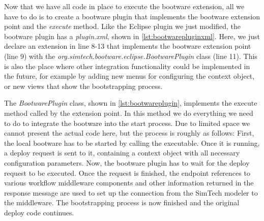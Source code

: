 \vspace*{\baselineskip}


Now that we have all code in place to execute the bootware extension, all we have to do is to create a bootware plugin that implements the bootware extension point and the \textit{execute} method.
Like the Eclipse plugin we just modified, the bootware plugin has a \textit{plugin.xml}, shown in \autoref{lst:bootwarepluginxml}.
Here, we just declare an extension in line 8-13 that implements the bootware extension point (line 9) with the \textit{org.simtech.bootware.eclipse.BootwarePlugin} class (line 11).
This is also the place where other integration functionality could be implemented in the future, for example by adding new menus for configuring the context object, or new views that show the bootstrapping process.

\vspace*{\baselineskip}

The \textit{BootwarePlugin} class, shown in \autoref{lst:bootwareplugin}, implements the execute method called by the extension point.
In this method we do everything we need to do to integrate the bootware into the start process.
Due to limited space we cannot present the actual code here, but the process is roughly as follows:
First, the local bootware has to be started by calling the executable.
Once it is running, a deploy request is sent to it, containing a context object with all necessary configuration parameters.
Now, the bootware plugin has to wait for the deploy request to be executed.
Once the request is finished, the endpoint references to various workflow middleware components and other information returned in the response message are used to set up the connection from the SimTech modeler to the middleware.
The bootstrapping process is now finished and the original deploy code continues.

\vspace*{\baselineskip}
